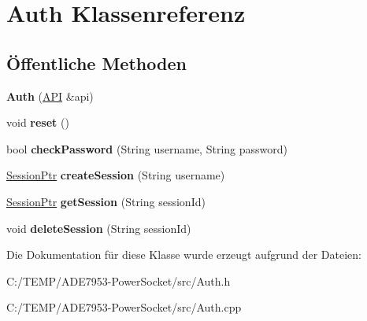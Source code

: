 \hypertarget{class_auth}{}\section{Auth Klassenreferenz}
\label{class_auth}
\subsection*{Öffentliche Methoden}
\begin{DoxyCompactItemize}
\item 
\mbox{\label{class_auth_a372114e80d70a2649df5c713a643022b}} 
{\bfseries Auth} (\hyperlink{class_a_p_i}{A\+PI} \&api)
\item 
\mbox{\label{class_auth_a426f6d69c1cc679442add50e0e167030}} 
void {\bfseries reset} ()
\item 
\mbox{\label{class_auth_a435a805d8de617fc0031996da58919c1}} 
bool {\bfseries check\+Password} (String username, String password)
\item 
\mbox{\label{class_auth_ae142f6d59d2230dae2ca4997f9946b8e}} 
\hyperlink{class_session}{Session\+Ptr} {\bfseries create\+Session} (String username)
\item 
\mbox{\label{class_auth_a8c3c138dedb562ab06f54270d42aaa6b}} 
\hyperlink{class_session}{Session\+Ptr} {\bfseries get\+Session} (String session\+Id)
\item 
\mbox{\label{class_auth_a411c5a172f77139388a9d047027dfad4}} 
void {\bfseries delete\+Session} (String session\+Id)
\end{DoxyCompactItemize}


Die Dokumentation für diese Klasse wurde erzeugt aufgrund der Dateien\+:\begin{DoxyCompactItemize}
\item 
C\+:/\+T\+E\+M\+P/\+A\+D\+E7953-\/\+Power\+Socket/src/Auth.\+h\item 
C\+:/\+T\+E\+M\+P/\+A\+D\+E7953-\/\+Power\+Socket/src/Auth.\+cpp\end{DoxyCompactItemize}
